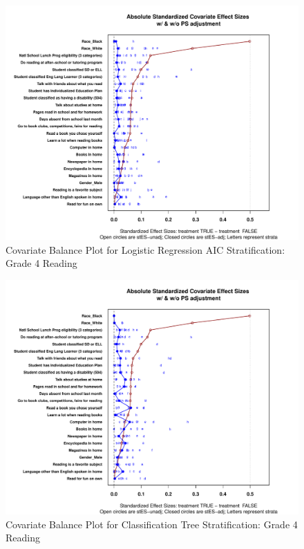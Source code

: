\documentclass[letterpaper,12p,twoside]{article} %
\begin{document}
\begin{figure}
\begin{center}
\includegraphics[width=\textwidth]{../Figures2009/g4read-lrAIC-balance.pdf}
\caption{Covariate Balance Plot for Logistic Regression AIC Stratification: Grade 4 Reading}
\end{center}
\end{figure}

\begin{figure}
\begin{center}
\includegraphics[width=\textwidth]{../Figures2009/g4read-tree-balance.pdf}
\caption{Covariate Balance Plot for Classification Tree Stratification: Grade 4 Reading}
\end{center}
\end{figure}
\end{document}
